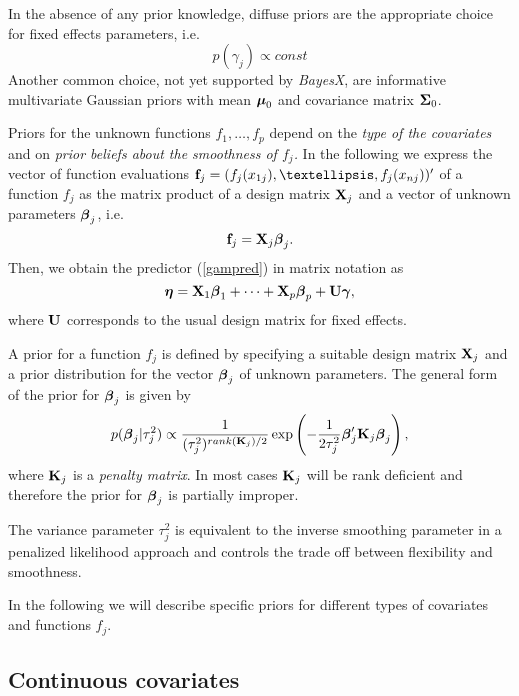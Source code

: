 \documentclass[11pt,a4paper,twoside]{bayesxarticle}
\begin{document}
In the absence of any prior knowledge, diffuse priors are the
appropriate choice for fixed effects parameters, i.e.
$$
 p(\gamma_j) \propto const
$$
Another common choice, not yet supported by {\em BayesX}, are
informative multivariate Gaussian priors with mean $\boldsymbol{\mu}_0$ and
covariance matrix $\boldsymbol{\Sigma}_0$.


Priors for the unknown functions $f_{1},\dots,f_{p}$ depend on the
{\em type of the covariates} and on {\em prior beliefs about the
smoothness of $f_j$.} In the following we express the vector of
function evaluations $\fvec_j=(f_j(x_{1j}),\dots,f_j(x_{nj}))'$ of a
function $f_j$ as the matrix product of a design matrix $\mathbf{X}_j$ and a
vector of unknown parameters $\boldsymbol{\beta}_j$, i.e.
\begin{equation}
\label{matproduct} \fvec_j=\Xvec_j \betavec_j.
\end{equation}
Then, we obtain the predictor (\ref{gampred}) in matrix notation
as
\begin{equation}
\label{gampredmatrix} \etavec = \Xvec_1 \betavec_1 + \cdots + \Xvec_p \betavec_p +
\Uvec \gammavec,
\end{equation}
where $\mathbf{U}$ corresponds to the usual design matrix for fixed
effects.

A prior for a function $f_j$ is defined by specifying a suitable
design matrix $\mathbf{X}_j$ and a prior distribution for the vector
$\boldsymbol{\beta}_j$ of unknown parameters. The general form of the prior for
$\boldsymbol{\beta}_j$ is given by
\begin{equation}
\label{genform} p(\betavec_j | \tau_j^2) \propto
\frac{1}{(\tau^2_j)^{rank(\Kvec_j)/2}} \exp\left(-\frac{1}{2\tau_j^2}
\betavec_j' \Kvec_j \betavec_j\right),
\end{equation}
where $\mathbf{K}_j$ is a {\em penalty matrix}. In most cases $\mathbf{K}_j$ will be
rank deficient and therefore the prior for $\boldsymbol{\beta}_j$ is partially improper.

The variance parameter $\tau_j^2$ is  equivalent to the inverse
smoothing parameter in a penalized likelihood approach and controls the
trade off between flexibility and smoothness.

In the following we will describe specific priors for different
types of covariates and functions $f_j$.


\subsection{Continuous covariates}
\label{psplines}
\end{document}
